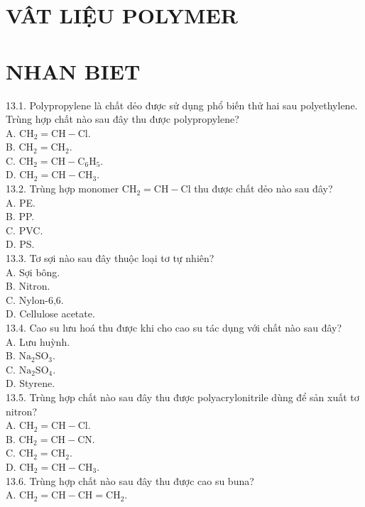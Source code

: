 \documentclass[10pt]{article}
\begin{document}
\section*{VÂT LIỆU POLYMER}
\section*{NHAN BIET}
13.1. Polypropylene là chất dẻo được sử dụng phổ biến thử hai sau polyethylene. Trùng hợp chất nào sau đây thu được polypropylene?\\
A. $\mathrm{CH}_{2}=\mathrm{CH}-\mathrm{Cl}$.\\
B. $\mathrm{CH}_{2}=\mathrm{CH}_{2}$.\\
C. $\mathrm{CH}_{2}=\mathrm{CH}-\mathrm{C}_{6} \mathrm{H}_{5}$.\\
D. $\mathrm{CH}_{2}=\mathrm{CH}-\mathrm{CH}_{3}$.\\
13.2. Trùng hợp monomer $\mathrm{CH}_{2}=\mathrm{CH}-\mathrm{Cl}$ thu được chất dẻo nào sau đây?\\
A. PE.\\
B. PP.\\
C. PVC.\\
D. PS.\\
13.3. Tơ sợi nào sau đây thuộc loại tơ tự nhiên?\\
A. Sợi bông.\\
B. Nitron.\\
C. Nylon-6,6.\\
D. Cellulose acetate.\\
13.4. Cao su lưu hoá thu được khi cho cao su tác dụng với chất nào sau đây?\\
A. Lưu huỳnh.\\
B. $\mathrm{Na}_{2} \mathrm{SO}_{3}$.\\
C. $\mathrm{Na}_{2} \mathrm{SO}_{4}$.\\
D. Styrene.\\
13.5. Trùng hợp chất nào sau đây thu được polyacrylonitrile dùng để sản xuất tơ nitron?\\
A. $\mathrm{CH}_{2}=\mathrm{CH}-\mathrm{Cl}$.\\
B. $\mathrm{CH}_{2}=\mathrm{CH}-\mathrm{CN}$.\\
C. $\mathrm{CH}_{2}=\mathrm{CH}_{2}$.\\
D. $\mathrm{CH}_{2}=\mathrm{CH}-\mathrm{CH}_{3}$.\\
13.6. Trùng hợp chất nào sau đây thu được cao su buna?\\
A. $\mathrm{CH}_{2}=\mathrm{CH}-\mathrm{CH}=\mathrm{CH}_{2}$.\\
\end{document}
